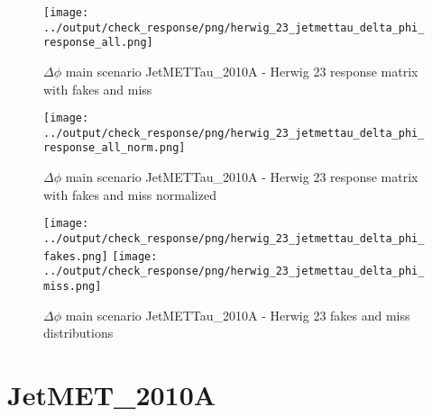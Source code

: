 \documentclass[11pt]{book}
\begin{document}
\begin{figure}[ht]
\centering
\texttt{[image: ../output/check\_response/png/herwig\_23\_jetmettau\_delta\_phi\_response\_all.png]}
\caption{$\Delta\phi$ main scenario JetMETTau\_2010A - Herwig 23 response matrix with fakes and miss}
\label{hw_23_jetmettau_delta_phi_response_all}
\end{figure}

\begin{figure}[ht]
\centering
\texttt{[image: ../output/check\_response/png/herwig\_23\_jetmettau\_delta\_phi\_response\_all\_norm.png]}
\caption{$\Delta\phi$ main scenario JetMETTau\_2010A - Herwig 23 response matrix with fakes and miss normalized}
\label{hw_23_jetmettau_delta_phi_response_all_norm}
\end{figure}

\begin{figure}[ht]
\centering
\texttt{[image: ../output/check\_response/png/herwig\_23\_jetmettau\_delta\_phi\_fakes.png]}
\texttt{[image: ../output/check\_response/png/herwig\_23\_jetmettau\_delta\_phi\_miss.png]}
\caption{$\Delta\phi$ main scenario JetMETTau\_2010A - Herwig 23 fakes and miss distributions}
\label{hw_23_jetmettau_delta_phi_fakesmiss}
\end{figure}



\clearpage
\section{JetMET\_2010A}
\end{document}
